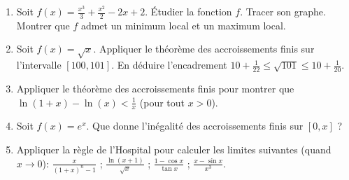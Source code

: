 \begin{frame}
\begin{miniexercice}
\begin{enumerate}
  \item Soit $f(x) = \frac{x^3}{3}+\frac{x^2}{2}-2x+2$. \'Etudier la fonction $f$. Tracer son graphe.
Montrer que $f$ admet un minimum local et un maximum local.

   \item Soit $f(x)=\sqrt{x}$. Appliquer le théorème des accroissements finis sur l'intervalle $[100,101]$.
En déduire l'encadrement $10+\frac{1}{22} \le \sqrt{101} \le 10 + \frac{1}{20}$.

  \item Appliquer le théorème des accroissements finis pour montrer que $\ln (1+x)-\ln(x) < \frac 1x$ (pour tout $x>0$).

  \item Soit $f(x) = e^x$. Que donne l'inégalité des accroissements finis sur $[0,x]$ ?

  \item Appliquer la règle de l'Hospital pour calculer les limites suivantes (quand $x\to 0$):
$\displaystyle \frac{x}{(1+x)^n-1}$ ; $\displaystyle \frac{\ln(x+1)}{\sqrt x}$ ; 
$\displaystyle \frac{1-\cos x}{\tan x}$ ; $\displaystyle \frac{x-\sin x}{x^3}$.
\end{enumerate}
\end{miniexercice}
\end{frame}


